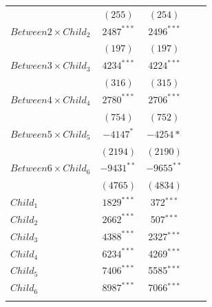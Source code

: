 {\begin{table}[H]
{\begin{tabular}{lcccc}
                                                 &$ (255)     $                      & $ (254)  $     \\
$Between2 \times Child_2$	                     &$ 2487^{***}$                      & $ 2496^{***}$    \\
                                                 &$ (197)     $                      & $ (197)  $     \\
$Between3 \times Child_3$	                     &$ 4234^{***}$                      & $ 4224^{***}$    \\
                                                 &$ (316)     $                      & $ (315)  $     \\
$Between4 \times Child_4$                        &$ 2780^{***}$                      & $ 2706^{***}$  \\
                                                 &$ (754)     $                      & $ (752)  $     \\
$Between5 \times Child_5$	                     &$ -4147^{*} $                      & $ -4254* $       \\
                                                 &$ (2194)    $                      & $ (2190) $     \\
$Between6 \times Child_6$	                     &$ -9431^{**}$                      & $ -9655^{**}$    \\
                                                 &$ (4765)    $                      & $ (4834) $     \\
\midrule  
$Child_1$                                        &  $1829^{***}$                  &372$^{***}$        \\
$Child_2$                                        &  $2662^{***}$                  &507$^{***}$        \\
$Child_3$                                        &  $4388^{***}$                  &2327$^{***}$       \\
$Child_4$                                        &  $6234^{***}$                  &4269$^{***}$       \\
$Child_5$                                        &  $7406^{***}$                  &5585$^{***}$       \\
$Child_6$                                        &  $8987^{***}$                  &7066$^{***}$       \\
\midrule                                                                                              \\

\end{tabular}}
\end{table}}
